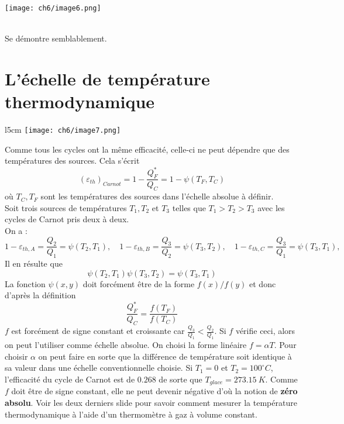 	\begin{center}
	\texttt{[image: ch6/image6.png]}
	\end{center}
	
	\ \\
	Se démontre semblablement.
	
	
	\section{L'échelle de température thermodynamique}
	\begin{wrapfigure}[10]{l}{5cm}
	\vspace{-5mm}
	\texttt{[image: ch6/image7.png]}
	\end{wrapfigure}
	Comme tous les cycles ont la même efficacité, celle-ci ne peut 
	dépendre que des températures des sources. Cela s'écrit 
	\begin{equation}
	(\varepsilon_{th})_{Carnot} = 1-\frac{Q_F^*}{Q_C} = 1 - 
	\psi(T_F,T_C)
	\end{equation}
	où $T_C,T_F$ sont les températures des sources dans l'échelle 
	absolue à définir.\\
	Soit trois sources de températures $T_1,T_2$ et $T_3$ telles que 
	$T_1 > T_2 > T_3$ avec les cycles de Carnot pris deux à deux.\\
	On a :\vspace{3mm}
	\begin{equation}
	1-\varepsilon_{th,A} = \frac{Q_2}{Q_1} = \psi(T_2,T_1),\quad 
	1-\varepsilon_{th,B} = \frac{Q_3}{Q_2} = \psi(T_3,T_2),\quad 
	1-\varepsilon_{th,C} = \frac{Q_3}{Q_1} = \psi(T_3,T_1),\quad 
	\end{equation}
	Il en résulte que
	\begin{equation}
	\psi(T_2,T_1)\psi(T_3,T_2) = \psi(T_3,T_1)
	\end{equation}
	La fonction $\psi(x,y)$ doit forcément être de la forme $f(x)/
	f(y)$ et donc d'après la définition
	\begin{equation}
	\frac{Q_F^*}{Q_C} = \frac{f(T_F)}{f(T_C)}
	\end{equation}
	$f$ est forcément de signe constant et croissante car $\frac{Q_3}{
	Q_1}<\frac{Q_2}{Q_1}$. Si $f$ vérifie ceci, alors on peut l'utiliser 
	comme échelle absolue. On choisi la forme linéaire $f = \alpha T$. 
	Pour choisir $\alpha$ on peut faire en sorte que la différence de 
	température soit identique à sa valeur dans une échelle conventionnelle 
	choisie. Si $T_1=0$ et $T_2=100^\circ C$, l'efficacité du cycle de 
	Carnot est de $0.268$ de sorte que $T_{glace} = 273.15\ K$. Comme $f$
	doit être de signe constant, elle ne peut devenir négative d'où la 
	notion de \textbf{zéro absolu}. Voir les deux derniers slide pour savoir 
	comment mesurer la température thermodynamique à l'aide d'un thermomètre 
	à gaz à volume constant.
